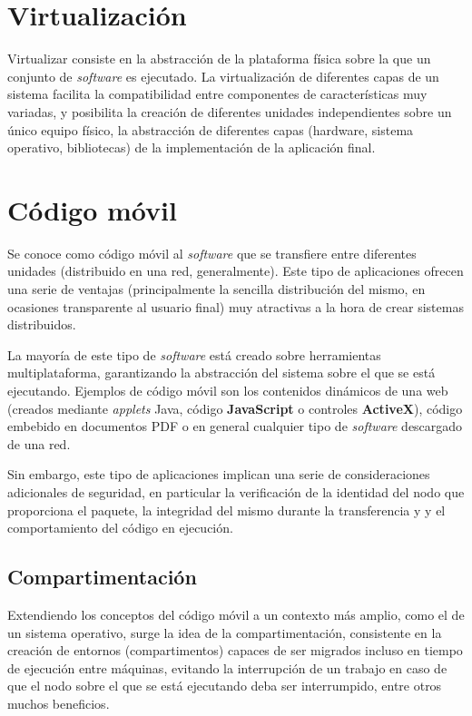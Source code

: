 \section{Virtualización}

Virtualizar consiste en la abstracción de la plataforma física sobre la que un conjunto de \textit{software} es ejecutado. La virtualización de diferentes capas de un sistema facilita la compatibilidad entre componentes de características muy variadas, y posibilita la creación de diferentes unidades independientes sobre un único equipo físico, la abstracción de diferentes capas (hardware, sistema operativo, bibliotecas) de la implementación de la aplicación final.

\section{Código móvil}

Se conoce como código móvil al \textit{software} que se transfiere entre diferentes unidades (distribuido en una red, generalmente). Este tipo de aplicaciones ofrecen una serie de ventajas (principalmente la sencilla distribución del mismo, en ocasiones transparente al usuario final) muy atractivas a la hora de crear sistemas distribuidos.

La mayoría de este tipo de \textit{software} está creado sobre herramientas multiplataforma, garantizando la abstracción del sistema sobre el que se está ejecutando. Ejemplos de código móvil son los contenidos dinámicos de una web (creados mediante \textit{applets} Java, código \textbf{JavaScript} o controles \textbf{ActiveX}), código embebido en documentos PDF o en general cualquier tipo de \textit{software} descargado de una red.

Sin embargo, este tipo de aplicaciones implican una serie de consideraciones adicionales de seguridad, en particular la verificación de la identidad del nodo que proporciona el paquete, la integridad del mismo durante la transferencia y \citationneeded{} y el comportamiento del código en ejecución.

\subsection{Compartimentación}

Extendiendo los conceptos del código móvil a un contexto más amplio, como el de un sistema operativo, surge la idea de la compartimentación, consistente en la creación de entornos (compartimentos) capaces de ser migrados incluso en tiempo de ejecución entre máquinas, evitando la interrupción de un trabajo en caso de que el nodo sobre el que se está ejecutando deba ser interrumpido, entre otros muchos beneficios.

